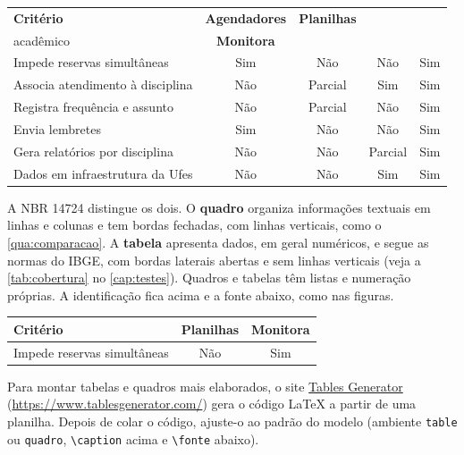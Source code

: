 \begin{quadro}[htbp]
  \centering
  \caption{Comparação entre as soluções existentes e o Monitora}
  \label{qua:comparacao}
  \small
  \begin{tabularx}{\textwidth}{|X|c|c|c|c|}
    \hline
    \textbf{Critério} & \textbf{Agendadores} & \textbf{Planilhas} &
      \textbf{\begin{tabular}[c]{@{}c@{}}Sistema\\acadêmico\end{tabular}} &
      \textbf{Monitora} \\
    \hline
    Impede reservas simultâneas & Sim & Não & Não & Sim \\
    \hline
    Associa atendimento à disciplina & Não & Parcial & Sim & Sim \\
    \hline
    Registra frequência e assunto & Não & Parcial & Não & Sim \\
    \hline
    Envia lembretes & Sim & Não & Não & Sim \\
    \hline
    Gera relatórios por disciplina & Não & Não & Parcial & Sim \\
    \hline
    Dados em infraestrutura da Ufes & Não & Não & Sim & Sim \\
    \hline
  \end{tabularx}
\end{quadro}

\begin{instrucao}
A NBR 14724 distingue os dois. O \textbf{quadro} organiza informações
textuais em linhas e colunas e tem bordas fechadas, com linhas verticais,
como o \cref{qua:comparacao}. A \textbf{tabela} apresenta dados, em geral
numéricos, e segue as normas do IBGE, com bordas laterais abertas e sem linhas
verticais (veja a \cref{tab:cobertura} no \cref{cap:testes}). Quadros e
tabelas têm listas e numeração próprias. A identificação fica acima e a fonte
abaixo, como nas figuras.
\begin{exemplocodigo}
\begin{quadro}[htbp]
  \centering
  \caption{Comparação entre as soluções}
  \label{qua:comparacao}
  \small
  \begin{tabular}{|l|c|c|}
    \hline
    \textbf{Critério} & \textbf{Planilhas} & \textbf{Monitora} \\
    \hline
    Impede reservas simultâneas & Não & Sim \\
    \hline
  \end{tabular}
  \fonteautor
\end{quadro}
\end{exemplocodigo}
Para montar tabelas e quadros mais elaborados, o site
\href{https://www.tablesgenerator.com/}{Tables Generator}
(\url{https://www.tablesgenerator.com/}) gera o código LaTeX a partir de uma
planilha. Depois de colar o código, ajuste-o ao padrão do modelo (ambiente
\verb|table| ou \verb|quadro|, \verb|\caption| acima e \verb|\fonte| abaixo).
\end{instrucao}
